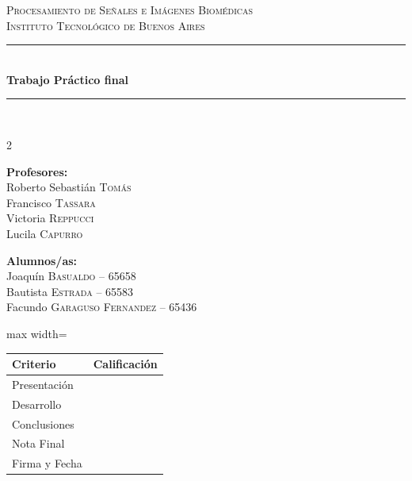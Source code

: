 \documentclass[10pt]{article}
\newcommand{\materia}{Procesamiento de Señales e Imágenes Biomédicas}
\newcommand{\institucion}{Instituto Tecnológico de Buenos Aires}
\newcommand{\numeroTP}{}
\newcommand{\nombreTP}{Trabajo Práctico final}
\newcommand{\HRule}{\rule{\linewidth}{0.5mm}}
\begin{document}
\begin{center}

\textsc{\LARGE \materia}\\[0.2cm]
\textsc{\Large \institucion}\\[0.2cm]

\HRule \\[0.2cm]
{\huge\bfseries \numeroTP{}  \nombreTP \\[0.2cm]}
\HRule \\[1cm]

\begin{multicols}{2}

\begin{flushleft}
    \large
    \textbf{Profesores:}\\
    Roberto Sebastián \textsc{Tomás}\\
    Francisco \textsc{Tassara}
    \\
    Victoria \textsc{Reppucci}\\
    Lucila \textsc{Capurro}
\end{flushleft}

\columnbreak

\begin{flushleft}
    \large
    \textbf{Alumnos/as:}\\
    Joaquín \textsc{Basualdo} -- 65658\\
    Bautista \textsc{Estrada} -- 65583\\
    Facundo \textsc{Garaguso Fernandez} -- 65436\\
    
\end{flushleft}

\end{multicols}

\vspace{0.5cm}

\renewcommand{\arraystretch}{1.6}

\begin{adjustbox}{max width=\textwidth}
\begin{tabular}{|p{6cm}|p{7cm}|}
\hline
\textbf{Criterio} & \textbf{Calificación} \\ \hline
Presentación & \\ \hline
Desarrollo & \\ \hline
Conclusiones & \\ \hline
Nota Final & \\ \hline\hline
Firma y Fecha & \\ \hline
\end{tabular}
\end{adjustbox}

\end{center}
\end{document}

